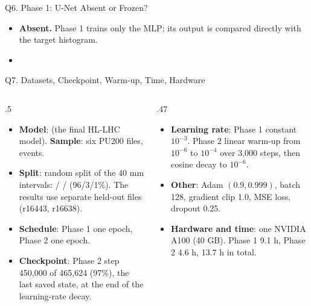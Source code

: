 \begin{frame}{Q6. Phase 1: U-Net Absent or Frozen?}
\small
\begin{itemize}\setlength\itemsep{.5em}
\item \textbf{Absent.} Phase 1 trains only the MLP; its output is compared directly with the target histogram.
\item {}
\end{itemize}
\end{frame}

\begin{frame}{Q7. Datasets, Checkpoint, Warm-up, Time, Hardware}
\footnotesize
\begin{columns}[T]
\begin{column}{.5\linewidth}
\begin{itemize}\setlength\itemsep{.3em}
\item \textbf{Model}: \hlModel{} (the final HL-LHC model). \textbf{Sample}: six PU200 files, \nPoolEvt{} events.
\item \textbf{Split}: random split of the 40 mm intervals: \nTrainSub{} / \nValSub{} / \nTestSub{} (96/3/1\%). The results use separate held-out files (r16443, r16638).
\item \textbf{Schedule}: Phase 1 one epoch, Phase 2 one epoch.
\item \textbf{Checkpoint}: Phase 2 step 450,000 of 465,624 (97\%), the last saved state, at the end of the learning-rate decay.
\end{itemize}
\end{column}
\begin{column}{.47\linewidth}
\begin{itemize}\setlength\itemsep{.3em}
\item \textbf{Learning rate}: Phase 1 constant $10^{-3}$. Phase 2 linear warm-up from $10^{-6}$ to $10^{-4}$ over 3,000 steps, then cosine decay to $10^{-6}$.
\item \textbf{Other}: Adam $(0.9, 0.999)$, batch 128, gradient clip 1.0, MSE loss, dropout 0.25.
\item \textbf{Hardware and time}: one NVIDIA A100 (40 GB). Phase 1 9.1 h, Phase 2 4.6 h, 13.7 h in total.
\end{itemize}
\end{column}
\end{columns}
\end{frame}

